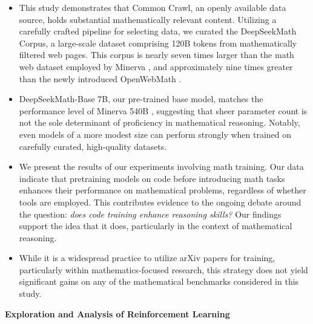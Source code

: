\begin{itemize}[topsep=0pt]
    \item This study demonstrates that Common Crawl, an openly available data source, holds substantial mathematically relevant content. Utilizing a carefully crafted pipeline for selecting data, we curated the DeepSeekMath Corpus, a large-scale dataset comprising 120B tokens from mathematically filtered web pages. This corpus is nearly seven times larger than the math web dataset employed by Minerva \citep{minerva}, and approximately nine times greater than the newly introduced OpenWebMath \citep{openwebmath}.

\item DeepSeekMath-Base 7B, our pre-trained base model, matches the performance level of Minerva 540B \citep{minerva}, suggesting that sheer parameter count is not the sole determinant of proficiency in mathematical reasoning. Notably, even models of a more modest size can perform strongly when trained on carefully curated, high-quality datasets.

\item We present the results of our experiments involving math training. Our data indicate that pretraining models on code before introducing math tasks enhances their performance on mathematical problems, regardless of whether tools are employed. This contributes evidence to the ongoing debate around the question: \textit{does code training enhance reasoning skills?} Our findings support the idea that it does, particularly in the context of mathematical reasoning.

\item While it is a widespread practice to utilize arXiv papers for training, particularly within mathematics-focused research, this strategy does not yield significant gains on any of the mathematical benchmarks considered in this study.
\end{itemize}

\textbf{Exploration and Analysis of Reinforcement Learning}

